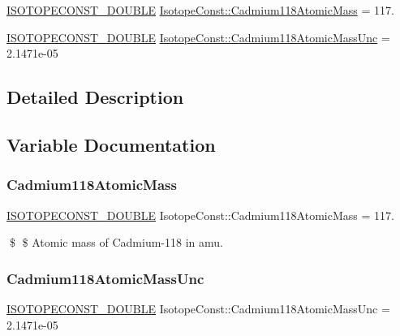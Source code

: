\begin{DoxyCompactItemize}
\item 
\mbox{\hyperlink{group___isotope_const-_macros_ga8f45a7272ce02c0b4c65c44636ed719a}{I\+S\+O\+T\+O\+P\+E\+C\+O\+N\+S\+T\+\_\+\+D\+O\+U\+B\+LE}} \mbox{\hyperlink{group___isotope_const-_cadmium-_cd118_gaa3fcb31da242e66442d6d09bbbfd64d1}{Isotope\+Const\+::\+Cadmium118\+Atomic\+Mass}} = 117.
\item 
\mbox{\hyperlink{group___isotope_const-_macros_ga8f45a7272ce02c0b4c65c44636ed719a}{I\+S\+O\+T\+O\+P\+E\+C\+O\+N\+S\+T\+\_\+\+D\+O\+U\+B\+LE}} \mbox{\hyperlink{group___isotope_const-_cadmium-_cd118_gaeaed3f2ec9467c8549ec83010722e42e}{Isotope\+Const\+::\+Cadmium118\+Atomic\+Mass\+Unc}} = 2.\+1471e-\/05
\end{DoxyCompactItemize}


\subsection{Detailed Description}


\subsection{Variable Documentation}
\mbox{\label{group___isotope_const-_cadmium-_cd118_gaa3fcb31da242e66442d6d09bbbfd64d1}} 
\subsubsection{\texorpdfstring{Cadmium118\+Atomic\+Mass}{Cadmium118AtomicMass}}
{\footnotesize\ttfamily \mbox{\hyperlink{group___isotope_const-_macros_ga8f45a7272ce02c0b4c65c44636ed719a}{I\+S\+O\+T\+O\+P\+E\+C\+O\+N\+S\+T\+\_\+\+D\+O\+U\+B\+LE}} Isotope\+Const\+::\+Cadmium118\+Atomic\+Mass = 117.}

\$ \$ Atomic mass of Cadmium-\/118 in amu. \mbox{\label{group___isotope_const-_cadmium-_cd118_gaeaed3f2ec9467c8549ec83010722e42e}} 
\subsubsection{\texorpdfstring{Cadmium118\+Atomic\+Mass\+Unc}{Cadmium118AtomicMassUnc}}
{\footnotesize\ttfamily \mbox{\hyperlink{group___isotope_const-_macros_ga8f45a7272ce02c0b4c65c44636ed719a}{I\+S\+O\+T\+O\+P\+E\+C\+O\+N\+S\+T\+\_\+\+D\+O\+U\+B\+LE}} Isotope\+Const\+::\+Cadmium118\+Atomic\+Mass\+Unc = 2.\+1471e-\/05}

